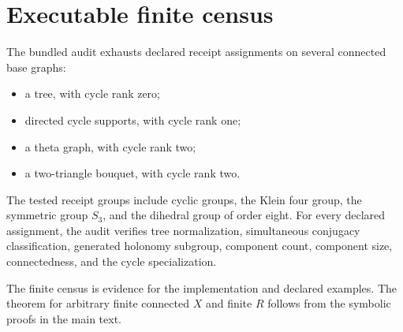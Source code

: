 \section{Executable finite census}

The bundled audit exhausts declared receipt assignments on several connected
base graphs:

\begin{itemize}
\item a tree, with cycle rank zero;
\item directed cycle supports, with cycle rank one;
\item a theta graph, with cycle rank two;
\item a two-triangle bouquet, with cycle rank two.
\end{itemize}

The tested receipt groups include cyclic groups, the Klein four group, the
symmetric group $S_3$, and the dihedral group of order eight. For every
declared assignment, the audit verifies tree normalization, simultaneous
conjugacy classification, generated holonomy subgroup, component count,
component size, connectedness, and the cycle specialization.

The finite census is evidence for the implementation and declared examples.
The theorem for arbitrary finite connected $X$ and finite $R$ follows from
the symbolic proofs in the main text.
